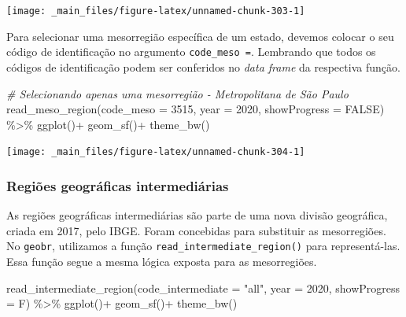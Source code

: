 \documentclass[
  brazilian,
]{book}
\newenvironment{Shaded}{\begin{snugshade}}{\end{snugshade}}
\newcommand{\AttributeTok}[1]{\textcolor[rgb]{0.77,0.63,0.00}{#1}}
\newcommand{\CommentTok}[1]{\textcolor[rgb]{0.56,0.35,0.01}{\textit{#1}}}
\newcommand{\ConstantTok}[1]{\textcolor[rgb]{0.00,0.00,0.00}{#1}}
\newcommand{\DecValTok}[1]{\textcolor[rgb]{0.00,0.00,0.81}{#1}}
\newcommand{\FunctionTok}[1]{\textcolor[rgb]{0.00,0.00,0.00}{#1}}
\newcommand{\NormalTok}[1]{#1}
\newcommand{\SpecialCharTok}[1]{\textcolor[rgb]{0.00,0.00,0.00}{#1}}
\newcommand{\StringTok}[1]{\textcolor[rgb]{0.31,0.60,0.02}{#1}}
\begin{document}
\begin{center}\texttt{[image: \_main\_files/figure-latex/unnamed-chunk-303-1]} \end{center}

Para selecionar uma mesorregião específica de um estado, devemos colocar o seu código de identificação no argumento \texttt{code\_meso\ =}. Lembrando que todos os códigos de identificação podem ser conferidos no \emph{data frame} da respectiva função.

\begin{Shaded}
\begin{Highlighting}[]
\CommentTok{\# Selecionando apenas uma mesorregião {-} Metropolitana de São Paulo}
\FunctionTok{read\_meso\_region}\NormalTok{(}\AttributeTok{code\_meso =} \DecValTok{3515}\NormalTok{,}
                 \AttributeTok{year =} \DecValTok{2020}\NormalTok{,}
                 \AttributeTok{showProgress =} \ConstantTok{FALSE}\NormalTok{) }\SpecialCharTok{\%\textgreater{}\%} 
  \FunctionTok{ggplot}\NormalTok{()}\SpecialCharTok{+}
  \FunctionTok{geom\_sf}\NormalTok{()}\SpecialCharTok{+}
  \FunctionTok{theme\_bw}\NormalTok{()}
\end{Highlighting}
\end{Shaded}

\begin{center}\texttt{[image: \_main\_files/figure-latex/unnamed-chunk-304-1]} \end{center}

\hypertarget{regiuxf5es-geogruxe1ficas-intermediuxe1rias}{%
\subsubsection{Regiões geográficas intermediárias}\label{regiuxf5es-geogruxe1ficas-intermediuxe1rias}}

As regiões geográficas intermediárias são parte de uma nova divisão geográfica, criada em 2017, pelo IBGE. Foram concebidas para substituir as mesorregiões. No \texttt{geobr}, utilizamos a função \texttt{read\_intermediate\_region()} para representá-las. Essa função segue a mesma lógica exposta para as mesorregiões.

\begin{Shaded}
\begin{Highlighting}[]
\FunctionTok{read\_intermediate\_region}\NormalTok{(}\AttributeTok{code\_intermediate =} \StringTok{"all"}\NormalTok{,}
                         \AttributeTok{year =} \DecValTok{2020}\NormalTok{,}
                         \AttributeTok{showProgress =}\NormalTok{ F) }\SpecialCharTok{\%\textgreater{}\%} 
  \FunctionTok{ggplot}\NormalTok{()}\SpecialCharTok{+}
  \FunctionTok{geom\_sf}\NormalTok{()}\SpecialCharTok{+}
  \FunctionTok{theme\_bw}\NormalTok{()}
\end{Highlighting}
\end{Shaded}
\end{document}
